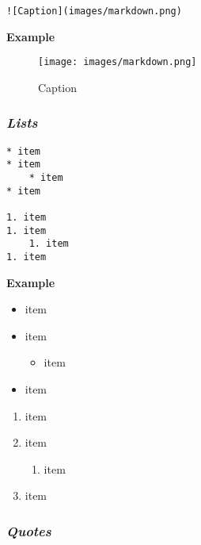 \documentclass[journal,]{IEEEtran}
\makeatletter
\providecommand{\tightlist}{%
  \setlength{\itemsep}{0pt}\setlength{\parskip}{0pt}}
\newcounter{figno}
\newenvironment{fignos:no-prefix-figure-caption}{
  \caption@ifcompatibility{}{
    \let\oldthefigure\thefigure
    \let\oldtheHfigure\theHfigure
    \renewcommand{\thefigure}{figno:\thefigno}
    \renewcommand{\theHfigure}{figno:\thefigno}
    \stepcounter{figno}
    \captionsetup{labelformat=empty}
  }
}{
  \caption@ifcompatibility{}{
    \captionsetup{labelformat=default}
    \let\thefigure\oldthefigure
    \let\theHfigure\oldtheHfigure
    \addtocounter{figure}{-1}
  }
}
\makeatother
\begin{document}
\begin{verbatim}
![Caption](images/markdown.png)
\end{verbatim}

\textbf{Example}

\begin{fignos:no-prefix-figure-caption}

\begin{figure}
\centering
\texttt{[image: images/markdown.png]}
\caption{Caption}
\end{figure}

\end{fignos:no-prefix-figure-caption}

\hypertarget{lists}{%
\subsubsection{\texorpdfstring{\textbf{\emph{Lists}}}{Lists}}\label{lists}}

\begin{verbatim}
* item
* item
    * item
* item

1. item
1. item
    1. item
1. item
\end{verbatim}

\textbf{Example}

\begin{itemize}
\tightlist
\item
  item
\item
  item

  \begin{itemize}
  \tightlist
  \item
    item
  \end{itemize}
\item
  item
\end{itemize}

\begin{enumerate}
\def\labelenumi{\arabic{enumi}.}
\tightlist
\item
  item
\item
  item

  \begin{enumerate}
  \def\labelenumii{\arabic{enumii}.}
  \tightlist
  \item
    item
  \end{enumerate}
\item
  item
\end{enumerate}

\hypertarget{quotes}{%
\subsubsection{\texorpdfstring{\textbf{\emph{Quotes}}}{Quotes}}\label{quotes}}
\end{document}
